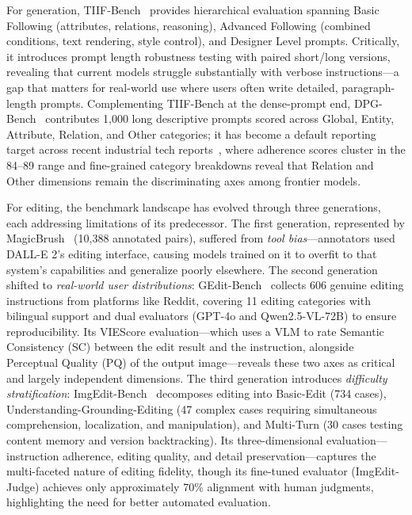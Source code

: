 \documentclass{llmxive}
\begin{document}
For generation, TIIF-Bench~\citep{TIIF-Bench} provides hierarchical evaluation spanning Basic Following (attributes, relations, reasoning), Advanced Following (combined conditions, text rendering, style control), and Designer Level prompts. Critically, it introduces prompt length robustness testing with paired short/long versions, revealing that current models struggle substantially with verbose instructions---a gap that matters for real-world use where users often write detailed, paragraph-length prompts. Complementing TIIF-Bench at the dense-prompt end, DPG-Bench~\citep{hu2024ella} contributes 1{,}000 long descriptive prompts scored across Global, Entity, Attribute, Relation, and Other categories; it has become a default reporting target across recent industrial tech reports~\citep{wu2025qwen, team2025longcat, cai2025z, team2026longcat}, where adherence scores cluster in the 84--89 range and fine-grained category breakdowns reveal that Relation and Other dimensions remain the discriminating axes among frontier models.

For editing, the benchmark landscape has evolved through three generations, each addressing limitations of its predecessor. The first generation, represented by MagicBrush~\citep{UltraEdit, AnyEdit} (10,388 annotated pairs), suffered from \emph{tool bias}---annotators used DALL-E 2's editing interface, causing models trained on it to overfit to that system's capabilities and generalize poorly elsewhere. The second generation shifted to \emph{real-world user distributions}: GEdit-Bench~\citep{Liu2025Step1XEditAP} collects 606 genuine editing instructions from platforms like Reddit, covering 11 editing categories with bilingual support and dual evaluators (GPT-4o and Qwen2.5-VL-72B) to ensure reproducibility. Its VIEScore evaluation---which uses a VLM to rate Semantic Consistency (SC) between the edit result and the instruction, alongside Perceptual Quality (PQ) of the output image---reveals these two axes as critical and largely independent dimensions. The third generation introduces \emph{difficulty stratification}: ImgEdit-Bench~\citep{ImgEdit} decomposes editing into Basic-Edit (734 cases), Understanding-Grounding-Editing (47 complex cases requiring simultaneous comprehension, localization, and manipulation), and Multi-Turn (30 cases testing content memory and version backtracking). Its three-dimensional evaluation---instruction adherence, editing quality, and detail preservation---captures the multi-faceted nature of editing fidelity, though its fine-tuned evaluator (ImgEdit-Judge) achieves only approximately 70\% alignment with human judgments, highlighting the need for better automated evaluation.
\end{document}
